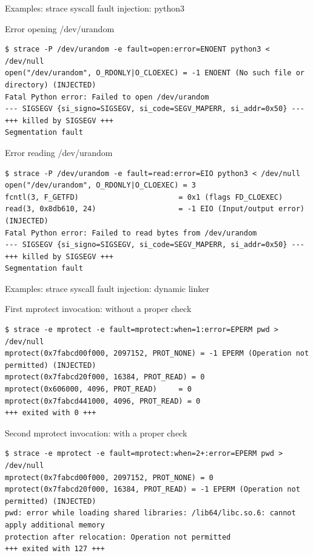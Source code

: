 \documentclass[unicode,aspectratio=169]{beamer}
\begin{document}
\begin{frame}[fragile]{Examples: strace syscall fault injection: python3}
\begin{block}{\large Error opening /dev/urandom}
\scriptsize
\begin{verbatim}
$ strace -P /dev/urandom -e fault=open:error=ENOENT python3 < /dev/null
open("/dev/urandom", O_RDONLY|O_CLOEXEC) = -1 ENOENT (No such file or directory) (INJECTED)
Fatal Python error: Failed to open /dev/urandom
--- SIGSEGV {si_signo=SIGSEGV, si_code=SEGV_MAPERR, si_addr=0x50} ---
+++ killed by SIGSEGV +++
Segmentation fault
\end{verbatim}
\end{block}
\begin{block}{\large Error reading /dev/urandom}
\scriptsize
\begin{verbatim}
$ strace -P /dev/urandom -e fault=read:error=EIO python3 < /dev/null
open("/dev/urandom", O_RDONLY|O_CLOEXEC) = 3
fcntl(3, F_GETFD)                       = 0x1 (flags FD_CLOEXEC)
read(3, 0x8db610, 24)                   = -1 EIO (Input/output error) (INJECTED)
Fatal Python error: Failed to read bytes from /dev/urandom
--- SIGSEGV {si_signo=SIGSEGV, si_code=SEGV_MAPERR, si_addr=0x50} ---
+++ killed by SIGSEGV +++
Segmentation fault
\end{verbatim}
\end{block}
\end{frame}

\begin{frame}[fragile]{Examples: strace syscall fault injection: dynamic linker}
\begin{block}{\large First mprotect invocation: without a proper check}
\scriptsize
\begin{verbatim}
$ strace -e mprotect -e fault=mprotect:when=1:error=EPERM pwd > /dev/null
mprotect(0x7fabcd00f000, 2097152, PROT_NONE) = -1 EPERM (Operation not permitted) (INJECTED)
mprotect(0x7fabcd20f000, 16384, PROT_READ) = 0
mprotect(0x606000, 4096, PROT_READ)     = 0
mprotect(0x7fabcd441000, 4096, PROT_READ) = 0
+++ exited with 0 +++
\end{verbatim}
\end{block}
\begin{block}{\large Second mprotect invocation: with a proper check}
\scriptsize
\begin{verbatim}
$ strace -e mprotect -e fault=mprotect:when=2+:error=EPERM pwd > /dev/null
mprotect(0x7fabcd00f000, 2097152, PROT_NONE) = 0
mprotect(0x7fabcd20f000, 16384, PROT_READ) = -1 EPERM (Operation not permitted) (INJECTED)
pwd: error while loading shared libraries: /lib64/libc.so.6: cannot apply additional memory
protection after relocation: Operation not permitted
+++ exited with 127 +++
\end{verbatim}
\end{block}
\end{frame}
\end{document}
